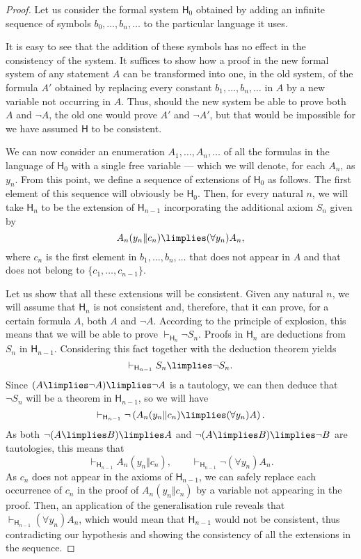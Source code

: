 \begin{proof}
Let us consider the formal system $\mathsf{H}_0$ obtained by adding an infinite sequence of symbols $b_0,\ldots,b_n,\ldots$ to the particular language it uses.

It is easy to see that the addition of these symbols has no effect in the consistency of the system.
It suffices to show how a proof in the new formal system of any statement $A$ can be transformed into one, in the old system, of the formula $A'$ obtained by replacing every constant $b_1,\ldots,b_n,\ldots$ in $A$ by a new variable not occurring in $A$.
Thus, should the new system be able to prove both $A$ and $\lnot A$, the old one would prove $A'$ and $\lnot A'$, but that would be impossible for we have assumed $\mathsf{H}$ to be consistent.

We can now consider an enumeration $A_1,\ldots,A_n,\ldots$ of all the formulas in the language of $\mathsf{H}_0$ with a single free variable --- which we will denote, for each $A_n$, as $y_n$. 
From this point, we define a sequence of extensions of $\mathsf{H}_0$ as follows.
The first element of this sequence will obviously be $\mathsf{H}_0$.
Then, for every natural $n$, we will take $\mathsf{H}_n$ to be the extension of $\mathsf{H}_{n-1}$ incorporating the additional axiom $S_n$ given by
\[ A_n(y_n\Vert c_n) \limplies (\forall y_n) A_n,\]
where $c_n$ is the first element in $b_1,\ldots,b_n,\ldots$ that does not appear in $A$ and that does not belong to $\{c_1,\ldots,c_{n-1}\}$. 

Let us show that all these extensions will be consistent. Given any natural $n$, we will assume that $\mathsf{H}_n$ is not consistent and, therefore, that it can prove, for a certain formula $A$, both $A$ and $\lnot A$.
According to the principle of explosion, this means that we will be able to prove $\vdash_{\mathsf{H}_n} \lnot S_n$. Proofs in $\mathsf{H}_n$ are deductions from $S_n$ in $\mathsf{H}_{n-1}$. Considering this fact together with the deduction theorem yields
\[ \vdash_{\mathsf{H}_{n-1}} S_n \limplies \lnot S_n.\]
Since $(A \limplies \lnot A) \limplies \lnot A$ is a tautology, we can then deduce that $\lnot S_n$ will be a theorem in $\mathsf{H}_{n-1}$, so we will have
\[ \vdash_{\mathsf{H}_{n-1}} \lnot \left( A_n(y_n\Vert c_n) \limplies (\forall y_n) A \right).\]
As both $\lnot(A\limplies B) \limplies A$ and $\lnot(A \limplies B) \limplies \lnot B$ are tautologies, this means that
\[ \vdash_{\mathsf{H}_{n-1}} A_n(y_n\Vert c_n),\qquad
\vdash_{\mathsf{H}_{n-1}} \lnot (\forall y_n) A_n.\]
As $c_n$ does not appear in the axioms of $\mathsf{H}_{n-1}$, we can safely replace each occurrence of $c_n$ in the proof of $A_n(y_n\Vert c_n)$ by a variable not appearing in the proof.
Then, an application of the generalisation rule reveals that $\vdash_{\mathsf{H}_{n-1}} (\forall y_n) A_n$, which would mean that $\mathsf{H}_{n-1}$ would not be consistent, thus contradicting our hypothesis and showing the consistency of all the extensions in the sequence.


\end{proof}
